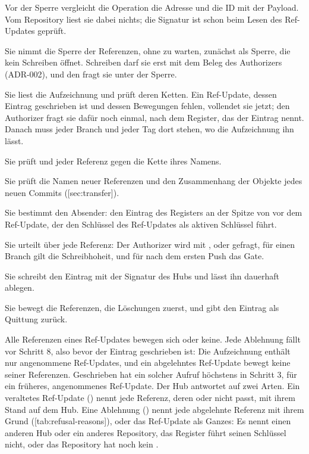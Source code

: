 \startitemize[n]
\item Vor der Sperre vergleicht die Operation die Adresse und die ID mit der Payload.
Vom Repository liest sie dabei nichts; die Signatur ist schon beim Lesen des Ref-Updates geprüft.
\item Sie nimmt die Sperre der Referenzen, ohne zu warten, zunächst als Sperre, die kein
Schreiben öffnet.
Schreiben darf sie erst mit dem Beleg des Authorizers (ADR-002), und den fragt sie unter der
Sperre.
\item Sie liest die Aufzeichnung und prüft deren Ketten.
Ein Ref-Update, dessen Eintrag geschrieben ist und dessen Bewegungen fehlen, vollendet sie jetzt;
den Authorizer fragt sie dafür noch einmal, nach dem Register, das der Eintrag nennt.
Danach muss jeder Branch und jeder Tag dort stehen, wo die Aufzeichnung ihn lässt.
\item Sie prüft  und  jeder Referenz gegen die Kette ihres Namens.
\item Sie prüft die Namen neuer Referenzen und den Zusammenhang der Objekte jedes neuen Commits
([sec:transfer]).
\item Sie bestimmt den Absender: den Eintrag des Registers an der Spitze von  vor dem
Ref-Update, der den Schlüssel des Ref-Updates als aktiven Schlüssel führt.
\item Sie urteilt über jede Referenz: Der Authorizer wird mit ,  oder
 gefragt, für einen Branch gilt die Schreibhoheit, und für  nach dem
ersten Push das Gate.
\item Sie schreibt den Eintrag mit der Signatur des Hubs und lässt ihn dauerhaft ablegen.
\item Sie bewegt die Referenzen, die Löschungen zuerst, und gibt den Eintrag als Quittung zurück.
\stopitemize

Alle Referenzen eines Ref-Updates bewegen sich oder keine.
Jede Ablehnung fällt vor Schritt 8, also bevor der Eintrag geschrieben ist: Die Aufzeichnung
enthält nur angenommene Ref-Updates, und ein abgelehntes Ref-Update bewegt keine seiner
Referenzen.
Geschrieben hat ein solcher Aufruf höchstens in Schritt 3, für ein früheres, angenommenes
Ref-Update.
Der Hub antwortet auf zwei Arten.
Ein veraltetes Ref-Update () nennt jede Referenz, deren  oder
 nicht passt, mit ihrem Stand auf dem Hub.
Eine Ablehnung () nennt jede abgelehnte Referenz mit ihrem Grund
([tab:refusal-reasons]), oder das Ref-Update als Ganzes: Es nennt einen anderen Hub
oder ein anderes Repository, das Register führt seinen Schlüssel nicht, oder das Repository hat
noch kein .


